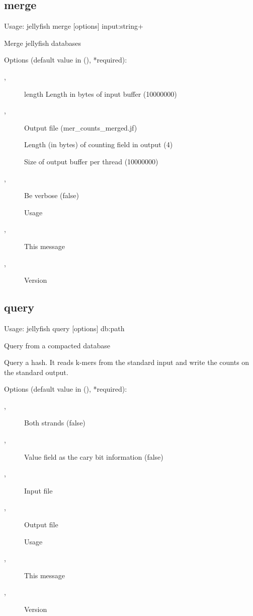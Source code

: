 \subsection{merge}
\noindent Usage: jellyfish merge [options] input:string+

\noindent Merge jellyfish databases

\noindent Options (default value in (), *required):
\begin{description}
\item[,] \noindent length          Length in bytes of input buffer (10000000)
\item[,] \noindent Output file (mer\_counts\_merged.jf)
\item[] \noindent Length (in bytes) of counting field in output (4)
\item[] \noindent Size of output buffer per thread (10000000)
\item[,] \noindent Be verbose (false)
\item[] \noindent Usage
\item[,] \noindent This message
\item[,] \noindent Version
\end{description}

\subsection{query}
\noindent Usage: jellyfish query [options] db:path

\noindent Query from a compacted database

\noindent Query a hash. It reads k-mers from the standard input and write the counts on the standard output.

\noindent Options (default value in (), *required):
\begin{description}
\item[,] \noindent Both strands (false)
\item[,] \noindent Value field as the cary bit information (false)
\item[,] \noindent Input file
\item[,] \noindent Output file
\item[] \noindent Usage
\item[,] \noindent This message
\item[,] \noindent Version
\end{description}

